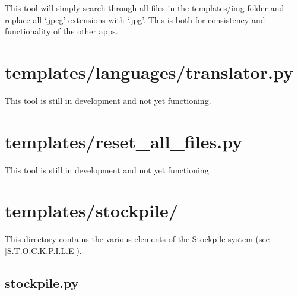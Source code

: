 This tool will simply search through all files in the templates/img folder and replace all `.jpeg' extensions with `.jpg'. This is both for consistency and  functionality of the other apps.



















\section{templates/languages/translator.py}

This tool is still in development and not yet functioning.



















\section{templates/reset\_all\_files.py}

This tool is still in development and not yet functioning.



















\section{templates/stockpile/}

This directory contains the various elements of the Stockpile system (see \ref{S.T.O.C.K.P.I.L.E}).

\subsection{stockpile.py}

